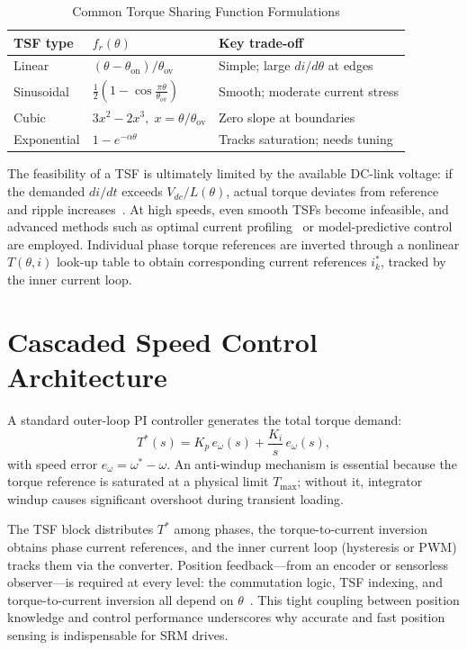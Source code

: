 \documentclass[conference]{IEEEtran}
\begin{document}
\begin{table}[htbp]
\caption{Common Torque Sharing Function Formulations}
\label{tab:tsf}
\centering
\begin{tabular}{@{}lll@{}}
\toprule
TSF type & $f_r(\theta)$ & Key trade-off \\
\midrule
Linear      & $(\theta-\theta_{\mathrm{on}})/\theta_{\mathrm{ov}}$ & Simple; large $di/d\theta$ at edges \\
Sinusoidal  & $\tfrac{1}{2}(1-\cos\tfrac{\pi\theta}{\theta_{\mathrm{ov}}})$ & Smooth; moderate current stress \\
Cubic       & $3x^2-2x^3,\; x=\theta/\theta_{\mathrm{ov}}$ & Zero slope at boundaries \\
Exponential & $1-e^{-\alpha\theta}$ & Tracks saturation; needs tuning \\
\bottomrule
\end{tabular}
\end{table}

The feasibility of a TSF is ultimately limited by the available DC-link voltage: if the demanded
$di/dt$ exceeds $V_{dc}/L(\theta)$, actual torque deviates from reference and ripple
increases~\cite{Xue2009,Zhu2015}. At high speeds, even smooth TSFs become infeasible, and
advanced methods such as optimal current profiling~\cite{Schramm1992} or model-predictive
control are employed. Individual phase torque references are inverted through a nonlinear
$T(\theta, i)$ look-up table to obtain corresponding current references $i_k^*$, tracked by the
inner current loop.

\section{Cascaded Speed Control Architecture}
A standard outer-loop PI controller generates the total torque demand:
\begin{equation}
T^*(s)=K_p\,e_\omega(s)+\frac{K_i}{s}\,e_\omega(s),
\end{equation}
with speed error $e_\omega = \omega^* - \omega$. An anti-windup mechanism is essential because
the torque reference is saturated at a physical limit $T_{\max}$; without it, integrator
windup causes significant overshoot during transient loading.

The TSF block distributes $T^*$ among phases, the torque-to-current inversion obtains phase
current references, and the inner current loop (hysteresis or PWM) tracks them via the
converter. Position feedback---from an encoder or sensorless observer---is required at every
level: the commutation logic, TSF indexing, and torque-to-current inversion all depend on
$\theta$~\cite{Cheok2000}. This tight coupling between position knowledge and control
performance underscores why accurate and fast position sensing is indispensable for SRM drives.
\end{document}
